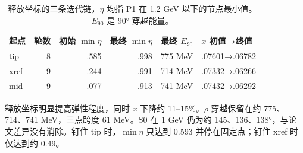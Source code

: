 \documentclass[UTF8,a4paper,11pt,fontset=fandol]{ctexart}
\numberwithin{equation}{section}
\begin{document}
\begin{table}[H]\centering\small
\begin{tabularx}{\linewidth}{lrrrrY}
\toprule
起点 & 轮数 & 初始 \(\min\eta\) & 最终 \(\min\eta\) & 最终 \(E_{90}\) & \(x\) 初值→终值\\
\midrule
tip & 8 & .585 & .998 & 775 MeV & .07601→.06782\\
xref & 9 & .244 & .991 & 714 MeV & .07332→.06266\\
mid & 9 & .077 & .913 & 741 MeV & .07432→.06292\\
\bottomrule
\end{tabularx}
\caption{释放坐标的三条迭代链，\(\eta\) 均指 P1 在 1.2 GeV 以下的节点最小值。\(E_{90}\) 是 90° 穿越能量。}
\end{table}

释放坐标明显提高弹性程度，同时 \(x\) 下降约 11--15\%。\(\rho\) 穿越保留在约 775、714、741 MeV，三点跨度 61 MeV。S0 在 1 GeV 仍为约 145、136、138°，与论文差异没有消除。钉住 tip 时，\(\min\eta\) 只达到 0.593 并停在固定点；钉住 xref 时仅达到约 0.49。
\end{document}
